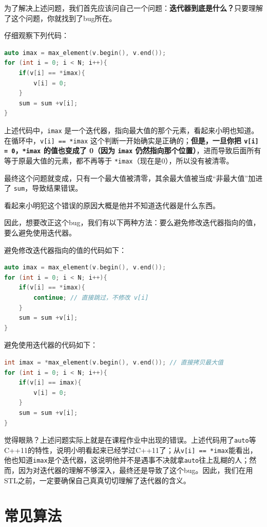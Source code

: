 \documentclass{article}
\begin{document}
\begin{soln}
  为了解决上述问题，我们首先应该问自己一个问题：\textbf{迭代器到底是什么？}只要理解了这个问题，你就找到了bug所在。

  仔细观察下列代码：
\begin{lstlisting}[language=C++]
auto imax = max_element(v.begin(), v.end());
for (int i = 0; i < N; i++){
    if(v[i] == *imax){
        v[i] = 0;
    }
    sum = sum +v[i];
}
\end{lstlisting}

  上述代码中，\texttt{imax} 是一个迭代器，指向最大值的那个元素，看起来小明也知道。在循环中，\texttt{v[i] == *imax} 这个判断一开始确实是正确的；\textbf{但是，一旦你把 \texttt{v[i] = 0}，\texttt{*imax} 的值也变成了 0（因为 \texttt{imax} 仍然指向那个位置）}，进而导致后面所有等于原最大值的元素，都不再等于 \texttt{*imax}（现在是0），所以没有被清零。

  最终这个问题就变成，只有一个最大值被清零，其余最大值被当成“非最大值”加进了 \texttt{sum}，导致结果错误。

  看起来小明犯这个错误的原因大概是他并不知道迭代器是什么东西。

  因此，想要改正这个bug，我们有以下两种方法：要么避免修改迭代器指向的值，要么避免使用迭代器。

  避免修改迭代器指向的值的代码如下：
\begin{lstlisting}[language=C++]
auto imax = max_element(v.begin(), v.end());
for (int i = 0; i < N; i++){
    if(v[i] == *imax){
        continue; // 直接跳过，不修改 v[i]
    }
    sum = sum +v[i];
}
\end{lstlisting}

  避免使用迭代器的代码如下：
\begin{lstlisting}[language=C++]
int imax = *max_element(v.begin(), v.end()); // 直接拷贝最大值
for (int i = 0; i < N; i++){
    if(v[i] == imax){
        v[i] = 0;
    }
    sum = sum +v[i];
}
\end{lstlisting}

\end{soln}

觉得眼熟？上述问题实际上就是在课程作业中出现的错误。上述代码用了\texttt{auto}等C++11的特性，说明小明看起来已经学过C++11了；从\texttt{v[i] == *imax}能看出，他也知道\texttt{imax}是个迭代器，这说明他并不是遇事不决就拿\texttt{auto}往上乱糊的人；然而，因为对迭代器的理解不够深入，最终还是导致了这个bug。因此，我们在用STL之前，一定要确保自己真真切切理解了迭代器的含义。

\section{常见算法}
\end{document}
